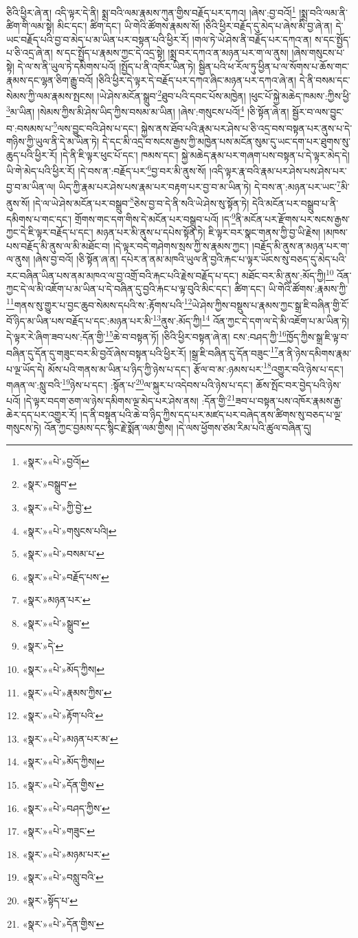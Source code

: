 ཅིའི་ཕྱིར་ཞེ་ན། འདི་ལྟར་དེ་ནི། སྨྲ་བའི་ལམ་རྣམས་ཀུན་གྱིས་བརྗོད་པར་དཀའ། །ཞེས་:བྱ་བའོ།\footnote{«སྣར་»«པེ་»བྱའོ།} །སྨྲ་བའི་ལམ་ནི་ཚིག་གི་ལམ་སྟེ། མིང་དང་། ཚིག་དང་། ཡི་གེའི་ཚོགས་རྣམས་སོ། །ཅིའི་ཕྱིར་བརྗོད་དུ་མེད་པ་ཞེས་མི་བྱ་ཞེ་ན། དེ་ཡང་བརྗོད་པའི་བྱ་བ་མེད་པ་མ་ཡིན་པར་བསྟན་པའི་ཕྱིར་རོ། །གལ་ཏེ་ཡེ་ཤེས་ནི་བརྗོད་པར་དཀའ་ན། ས་དང་སྤྱོད་པ་ཅི་འདྲ་ཞེ་ན། ས་དང་སྤྱོད་པ་རྣམས་ཀྱང་དེ་འདྲ་སྟེ། །སྨྲ་བར་དཀའ་ན་མཉན་པར་ག་ལ་ནུས། །ཞེས་གསུངས་པ་སྟེ། དེ་ལ་ས་ནི་ཡུལ་ཏེ་དམིགས་པའོ། །སྤྱོད་པ་ནི་འཁོར་ཡིན་ཏེ། སྦྱིན་པའི་ཕ་རོལ་ཏུ་ཕྱིན་པ་ལ་སོགས་པ་ཆོས་གང་རྣམས་དང་ལྷན་ཅིག་རྒྱུ་བའོ། །ཅིའི་ཕྱིར་དེ་ལྟར་དེ་བརྗོད་པར་དཀའ་ཞིང་མཉན་པར་དཀའ་ཞེ་ན། དེ་ནི་བསམ་དང་སེམས་ཀྱི་ལམ་རྣམས་སྤངས། །ཡེ་ཤེས་མངོན་སྒྲུབ་\footnote{«སྣར་»བསྒྲུབ་}ཐུབ་པའི་དབང་པོས་མཁྱེན། །ཕུང་པོ་སྐྱེ་མཆེད་ཁམས་:ཀྱིས་ཕྱི་\footnote{«སྣར་»«པེ་»ཀྱི་བྱེ་}མ་ཡིན། །སེམས་ཀྱིས་མི་ཤེས་ཡིད་ཀྱིས་བསམ་མ་ཡིན། །ཞེས་:གསུངས་པའོ།\footnote{«སྣར་»«པེ་»གསུངས་པའི།} །ཅི་སྟོན་ཞེ་ན། སྦྱོར་བ་ལས་བྱུང་བ་:བསམས་པ་\footnote{«སྣར་»«པེ་»བསམ་པ་}ལས་བྱུང་བའི་ཤེས་པ་དང་། སྐྱེས་ནས་ཐོབ་པའི་རྣམ་པར་ཤེས་པ་ཅི་འདྲ་བས་བསྟན་པར་ནུས་པ་དེ་གཉིས་ཀྱི་ཡུལ་ནི་དེ་མ་ཡིན་ཏེ། དེ་དང་མི་འདྲ་བ་སངས་རྒྱས་ཀྱི་མཁྱེན་པས་མངོན་སུམ་དུ་ཡང་དག་པར་ཐུགས་སུ་ཆུད་པའི་ཕྱིར་རོ། །དེ་ནི་ཇི་ལྟར་ཕུང་པོ་དང་། ཁམས་དང་། སྐྱེ་མཆེད་རྣམ་པར་གཞག་པས་བསྟན་པ་དེ་ལྟར་མེད་དེ། ཡི་གེ་མེད་པའི་ཕྱིར་རོ། །དེ་བས་ན་:བརྗོད་པར་\footnote{«སྣར་»«པེ་»བརྗོད་པས་}བྱ་བར་མི་ནུས་སོ། །འདི་ལྟར་རྣ་བའི་རྣམ་པར་ཤེས་པས་ཤེས་པར་བྱ་བ་མ་ཡིན་ལ། ཡིད་ཀྱི་རྣམ་པར་ཤེས་པས་རྣམ་པར་བརྟག་པར་བྱ་བ་མ་ཡིན་ཏེ། དེ་བས་ན་:མཉན་པར་ཡང་\footnote{«སྣར་»མཉན་པར་}མི་ནུས་སོ། །དེ་ལ་ཡེ་ཤེས་མངོན་པར་བསྒྲུབ་\footnote{«སྣར་»«པེ་»སྒྲུབ་}ཅེས་བྱ་བ་དེ་ནི་སའི་ཡེ་ཤེས་སུ་སྟོན་ཏེ། དེའི་མངོན་པར་བསྒྲུབ་པ་ནི་དམིགས་པ་གང་དང་། གྲོགས་གང་དག་གིས་དེ་མངོན་པར་བསྒྲུབ་པའོ། །ད་\footnote{«སྣར་»དེ་}ནི་མངོན་པར་རྫོགས་པར་སངས་རྒྱས་ཀྱང་དེ་ཇི་ལྟར་བརྗོད་པ་དང་། མཉན་པར་མི་ནུས་པ་དཔེས་སྟོན་ཏེ། ཇི་ལྟར་བར་སྣང་གནས་ཀྱི་བྱ་ཡི་རྗེས། །མཁས་པས་བརྗོད་མི་ནུས་ལ་མི་མཐོང་བ། །དེ་ལྟར་བདེ་གཤེགས་སྲས་ཀྱི་ས་རྣམས་ཀྱང་། །བརྗོད་མི་ནུས་ན་མཉན་པར་ག་ལ་ནུས། །ཞེས་བྱ་བའོ། །ཅི་སྟོན་ཞ་ན། དཔེར་ན་ནམ་མཁའི་ཡུལ་ནི་བྱའི་རྐང་པ་ལྟར་ཡོངས་སུ་བཅད་དུ་མེད་པའི་རང་བཞིན་ཡིན་པས་ནམ་མཁའ་ལ་བྱ་འགྲོ་བའི་རྐང་པའི་རྗེས་བརྗོད་པ་དང་། མཐོང་བར་མི་ནུས་:མོད་ཀྱི།\footnote{«སྣར་»«པེ་»མོད་ཀྱིས།} འོན་ཀྱང་དེ་ལ་མི་འཇོག་པ་མ་ཡིན་པ་དེ་བཞིན་དུ་བྱའི་རྐང་པ་ལྟ་བུའི་མིང་དང་། ཚིག་དང་། ཡི་གེའི་ཚོགས་:རྣམས་ཀྱི་\footnote{«སྣར་»«པེ་»རྣམས་ཀྱིས་}གནས་སུ་གྱུར་པ་བྱང་ཆུབ་སེམས་དཔའི་ས་:རྟོགས་པའི་\footnote{«སྣར་»«པེ་»རྟོག་པའི་}ཡེ་ཤེས་ཀྱིས་བསྡུས་པ་རྣམས་ཀྱང་སྒྲ་ཇི་བཞིན་གྱི་ངོ་བོ་ཉིད་མ་ཡིན་པས་བརྗོད་པ་དང་:མཉན་པར་མི་\footnote{«སྣར་»«པེ་»མཉན་པར་མ་}ནུས་:མོད་ཀྱི།\footnote{«སྣར་»«པེ་»མོད་ཀྱིས།} འོན་ཀྱང་དེ་དག་ལ་དེ་མི་འཇོག་པ་མ་ཡིན་ཏེ། དེ་ལྟར་རེ་ཞིག་ཟབ་པས་:དོན་གྱི་\footnote{«སྣར་»«པེ་»དོན་གྱིས་}ཆེ་བ་བསྟན་ཏོ། །ཅིའི་ཕྱིར་བསྟན་ཞེ་ན། ངས་:བཤད་ཀྱི་\footnote{«སྣར་»«པེ་»བཤད་ཀྱིས་}ཁྱོད་ཀྱིས་སྒྲ་ཇི་ལྟ་བ་བཞིན་དུ་དོན་དུ་གཟུང་བར་མི་བྱའོ་ཞེས་བསྟན་པའི་ཕྱིར་རོ། །སྒྲ་ཇི་བཞིན་དུ་དོན་བཟུང་\footnote{«སྣར་»«པེ་»གཟུང་}ན་ནི་ཉེས་དམིགས་རྣམ་པ་ལྔ་ཡོད་དེ། མོས་པའི་གནས་མ་ཡིན་པ་ཉིད་ཀྱི་ཉེས་པ་དང་། རྩོལ་བ་མ་:ཉམས་པར་\footnote{«སྣར་»«པེ་»མཉམ་པར་}འགྱུར་བའི་ཉེས་པ་དང་། གཞན་ལ་:སླུ་བའི་\footnote{«སྣར་»«པེ་»བསླུ་བའི་}ཉེས་པ་དང་། :སྟོན་པ་\footnote{«སྣར་»སྟོད་པ་}ལ་སྐུར་པ་འདེབས་པའི་ཉེས་པ་དང་། ཆོས་སྤོང་བར་བྱེད་པའི་ཉེས་པའོ། །དེ་ལྟར་བདག་ཅག་ལ་ཉེས་དམིགས་ལྔ་མེད་པར་ཤེས་ནས། :དོན་གྱི་\footnote{«སྣར་»«པེ་»དོན་གྱིས་}ཟབ་པ་བསྟན་པས་འཁོར་རྣམས་རྒྱ་ཆེར་དད་པར་འགྱུར་རོ། །ད་ནི་བསྟན་པའི་ཆེ་བ་ཉིད་ཀྱིས་དད་པར་མཛད་པར་བཞེད་ནས་ཚིགས་སུ་བཅད་པ་ལྔ་གསུངས་ཏེ། འོན་ཀྱང་བྱམས་དང་སྙིང་རྗེ་སྨོན་ལམ་གྱིས། །དེ་ལས་ཕྱོགས་ཙམ་རིམ་པའི་ཚུལ་བཞིན་དུ། 